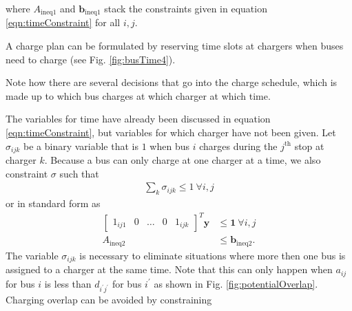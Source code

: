 	where $A_{\text{ineq1}}$ and $\mathbf{b}_{\text{ineq1}}$ stack the constraints given in equation \ref{eqn:timeConstraint} for all $i,j$.
\par A charge plan can be formulated by reserving time slots at chargers when buses need to charge (see Fig. \ref{fig:busTime4}).

	Note how there are several decisions that go into the charge schedule, which is made up to which bus charges at which charger at which time. 
	\par The variables for time have already been discussed in equation \ref{eqn:timeConstraint}, but variables for which charger have not been given.  Let $\sigma_{ijk}$ be a binary variable that is $1$ when bus $i$ charges during the $j^{\text{th}}$ stop at charger $k$. Because a bus can only charge at one charger at a time, we also constraint $\sigma$ such that
\begin{equation}
	\begin{aligned}
		\sum_k \sigma_{ijk} \le 1 \ \forall i,j
	\end{aligned}
\end{equation} 
or in standard form as 
\begin{equation} \begin{aligned}
	\begin{bmatrix}1_{ij1} & 0 & \hdots & 0 & 1_{ijk} \end{bmatrix}^T \mathbf{y} &\le \mathbf{1} \ \forall i,j\\
		A_{\text{ineq2}} & \le \mathbf{b}_{\text{ineq2}}. 
\end{aligned} \end{equation}
The variable $\sigma_{ijk}$ is necessary to eliminate situations where more then one bus is assigned to a charger at the same time. Note that this can only happen when $a_{ij}$ for bus $i$ is less than $d_{i^{'}j^{'}}$ for bus $i^{'}$ as shown in Fig. \ref{fig:potentialOverlap}. Charging overlap can be avoided by constraining



